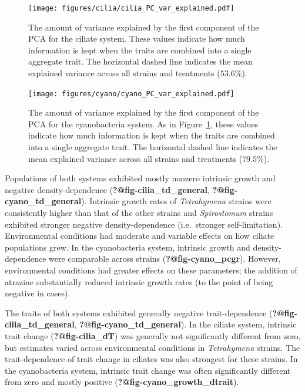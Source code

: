 \documentclass[
  letterpaper,
  DIV=11,
  numbers=noendperiod]{scrartcl}
\begin{document}
\begin{figure}

{\centering \texttt{[image: figures/cilia/cilia\_PC\_var\_explained.pdf]}

}

\caption{\label{fig-cilia_PC_var_explained}The amount of variance
explained by the first component of the PCA for the ciliate system.
These values indicate how much information is kept when the traits are
combined into a single aggregate trait. The horizontal dashed line
indicates the mean explained variance across all strains and treatments
(\(53.6\%\)).}

\end{figure}

\begin{figure}

{\centering \texttt{[image: figures/cyano/cyano\_PC\_var\_explained.pdf]}

}

\caption{\label{fig-cyano_PC_var_explained}The amount of variance
explained by the first component of the PCA for the cyanobacteria
system. As in Figure~\ref{fig-cilia_PC_var_explained}, these values
indicate how much information is kept when the traits are combined into
a single aggregate trait. The horizontal dashed line indicates the mean
explained variance across all strains and treatments (\(79.5\%\)).}

\end{figure}

Populations of both systems exhibited mostly nonzero intrinsic growth
and negative density-dependence (\textbf{?@fig-cilia\_td\_general},
\textbf{?@fig-cyano\_td\_general}). Intrinsic growth rates of
\emph{Tetrahymena} strains were consistently higher than that of the
other strains and \emph{Spirostomum} strains exhibited stronger negative
density-dependence (i.e.~stronger self-limitation). Environmental
conditions had moderate and variable effects on how ciliate populations
grew. In the cyanobacteria system, intrinsic growth and
density-dependence were comparable across strains
(\textbf{?@fig-cyano\_pcgr}). However, environmental conditions had
greater effects on these parameters; the addition of atrazine
substantially reduced intrinsic growth rates (to the point of being
negative in cases).

The traits of both systems exhibited generally negative trait-dependence
(\textbf{?@fig-cilia\_td\_general}, \textbf{?@fig-cyano\_td\_general}).
In the ciliate system, intrinsic trait change (\textbf{?@fig-cilia\_dT})
was generally not significantly different from zero, but estimates
varied across environmental conditions in \emph{Tetrahymena} strains.
The trait-dependence of trait change in ciliates was also strongest for
these strains. In the cyanobacteria system, intrinsic trait change was
often significantly different from zero and mostly positive
(\textbf{?@fig-cyano\_growth\_dtrait}).
\end{document}
